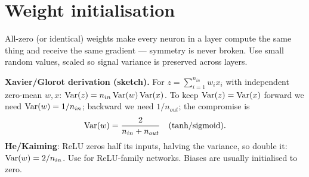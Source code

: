 \section{Weight initialisation}
All-zero (or identical) weights make every neuron in a layer compute the same thing and receive the same gradient --- symmetry is never broken. Use small random values, scaled so signal variance is preserved across layers.

\textbf{Xavier/Glorot derivation (sketch).} For $z=\sum_{i=1}^{n_{in}}w_ix_i$ with independent zero-mean $w,x$: $\operatorname{Var}(z)=n_{in}\operatorname{Var}(w)\operatorname{Var}(x)$. To keep $\operatorname{Var}(z)=\operatorname{Var}(x)$ forward we need $\operatorname{Var}(w)=1/n_{in}$; backward we need $1/n_{out}$; the compromise is
\[\operatorname{Var}(w)=\frac{2}{n_{in}+n_{out}}\quad(\text{tanh/sigmoid}).\]
\textbf{He/Kaiming}: ReLU zeros half its inputs, halving the variance, so double it: $\operatorname{Var}(w)=2/n_{in}$. Use for ReLU-family networks. Biases are usually initialised to zero.

